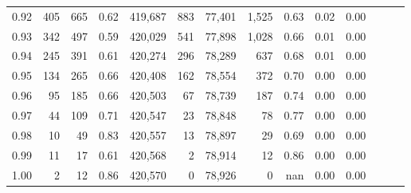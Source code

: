 \begin{tabular}{rrrrrrrrrrrrrr}
0.92 &    405 &    665 &  0.62 &  419,687 &      883 &  77,401 &   1,525 &  0.63 &  0.02 &      0.00 \\
0.93 &    342 &    497 &  0.59 &  420,029 &      541 &  77,898 &   1,028 &  0.66 &  0.01 &      0.00 \\
0.94 &    245 &    391 &  0.61 &  420,274 &      296 &  78,289 &     637 &  0.68 &  0.01 &      0.00 \\
0.95 &    134 &    265 &  0.66 &  420,408 &      162 &  78,554 &     372 &  0.70 &  0.00 &      0.00 \\
0.96 &     95 &    185 &  0.66 &  420,503 &       67 &  78,739 &     187 &  0.74 &  0.00 &      0.00 \\
0.97 &     44 &    109 &  0.71 &  420,547 &       23 &  78,848 &      78 &  0.77 &  0.00 &      0.00 \\
0.98 &     10 &     49 &  0.83 &  420,557 &       13 &  78,897 &      29 &  0.69 &  0.00 &      0.00 \\
0.99 &     11 &     17 &  0.61 &  420,568 &        2 &  78,914 &      12 &  0.86 &  0.00 &      0.00 \\
1.00 &      2 &     12 &  0.86 &  420,570 &        0 &  78,926 &       0 &   nan &  0.00 &      0.00 \\
\bottomrule
\end{tabular}
